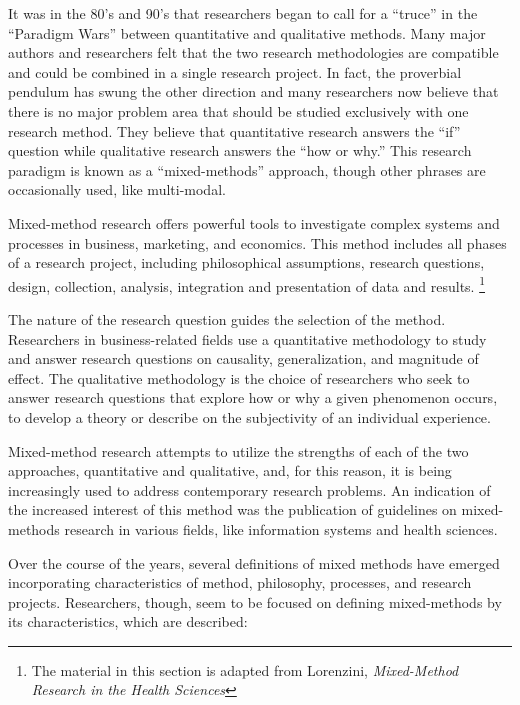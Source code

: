 It was in the 80's and 90's that researchers began to call for a ``truce'' in the ``Paradigm Wars'' between quantitative and qualitative methods. Many major authors and researchers felt that the two research methodologies are compatible and could be combined in a single research project. In fact, the proverbial pendulum has swung the other direction and many researchers now believe that there is no major problem area that should be studied exclusively with one research method. They believe that quantitative research answers the ``if'' question while qualitative research answers the ``how or why.'' This research paradigm is known as a ``mixed-methods'' approach, though other phrases are occasionally used, like multi-modal.

Mixed-method research offers powerful tools to investigate complex systems and processes in business, marketing, and economics. This method includes all phases of a research project, including philosophical assumptions, research questions, design, collection, analysis, integration and presentation of data and results. \footnote{The material in this section is adapted from Lorenzini, \textit{Mixed-Method Research in the Health Sciences}\cite{lorenzini2017mixed}}

The nature of the research question guides the selection of the method. Researchers in business-related fields use a quantitative methodology to study and answer research questions on causality, generalization, and magnitude of effect. The qualitative methodology is the choice of researchers who seek to answer research questions that explore how or why a given phenomenon occurs, to develop a theory or describe on the subjectivity of an individual experience.

Mixed-method research attempts to utilize the strengths of each of the two approaches, quantitative and qualitative, and, for this reason, it is being increasingly used to address contemporary research problems. An indication of the increased interest of this method was the publication of guidelines on mixed-methods research in various fields, like information systems\cite{venkatesh2013bridging} and health sciences\cite{creswell2004designing}.

Over the course of the years, several definitions of mixed methods have emerged incorporating characteristics of method, philosophy, processes, and research projects. Researchers, though, seem to be focused on defining mixed-methods by its characteristics, which are described:

